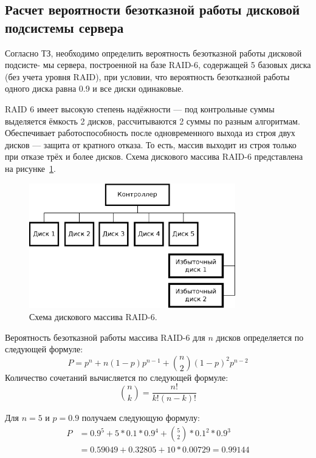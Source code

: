 \documentclass[russian,utf8,emptystyle]{eskdtext}
\begin{document}
\begin{enumerate}[label=\arabic*.]
\end{enumerate}

\clearpage
\subsection{Расчет вероятности безотказной работы дисковой подсистемы сервера}
Согласно ТЗ, необходимо определить вероятность безотказной работы дисковой подсисте-
мы сервера, построенной на базе RAID-6, содержащей 5 базовых диска (без учета уровня RAID),
при условии, что вероятность безотказной работы одного диска равна 0.9 и все диски одинаковые.

RAID 6 имеет высокую степень надёжности — под контрольные суммы выделяется ёмкость
2 дисков, рассчитываются 2 суммы по разным алгоритмам. Обеспечивает работоспособность после
одновременного выхода из строя двух дисков — защита от кратного отказа. То есть, массив выходит
из строя только при отказе трёх и более дисков. Схема дискового массива RAID-6 представлена на рисунке~\ref{fig:raid-6}.

\begin{figure}[h!]
\centering
\includegraphics[width=0.8\textwidth]{raid-6}
\caption{Схема дискового массива RAID-6.}
\label{fig:raid-6}
\end{figure}

Вероятность безотказной работы массива RAID-6 для $n$ дисков определяется по следующей формуле:
$$
P = p^n + n(1-p)p^{n-1} + {n \choose 2}(1-p)^2 p^{n-2}
$$
Количество сочетаний вычисляется по следующей формуле:
$$
{n \choose k} = \frac{n!}{k!(n-k)!}
$$

Для $n=5$ и $p=0.9$ получаем следующую формулу:
\begin{align} \label{eq:raid-6}
P & = 0.9^5 + 5*0.1*0.9^4 + {5 \choose 2}*0.1^2*0.9^3 \\
  & = 0.59049 + 0.32805 + 10*0.00729 = 0.99144
\end{align}
\end{document}
